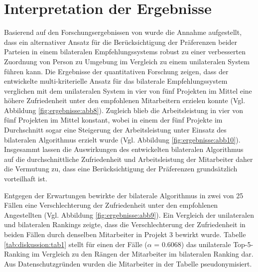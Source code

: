 \section{Interpretation der Ergebnisse}
Basierend auf den Forschungsergebnissen von \textcite[S.1 ff.]{link:booklet} wurde die Annahme aufgestellt, dass ein alternativer Ansatz für die Berücksichtigung der Präferenzen beider Parteien in einem bilateralen Empfehlungssystems robust zu einer verbesserten Zuordnung von Person zu Umgebung im Vergleich zu einem unilateralen System führen kann.
Die Ergebnisse der quantitativen Forschung zeigen, dass der entwickelte multi-kriterielle Ansatz für das bilaterale Empfehlungssystem verglichen mit dem unilateralen System in vier von fünf Projekten im Mittel eine höhere Zufriedenheit unter den empfohlenen Mitarbeitern erzielen konnte (Vgl. Abbildung \ref{fig:ergebnisse:abb8}).
Zugleich blieb die Arbeitsleistung in vier von fünf Projekten im Mittel konstant, wobei in einem der fünf Projekte im Durchschnitt sogar eine Steigerung der Arbeitsleistung unter Einsatz des bilateralen Algorithmus erzielt wurde (Vgl. Abbildung \ref{fig:ergebnisse:abb10}).
Insgesammt lassen die Auswirkungen des entwickelten bilateralen Algorithmus auf die durchschnittliche Zufriedenheit und Arbeitsleistung der Mitarbeiter daher die Vermutung zu, dass eine Berücksichtigung der Präferenzen grundsätzlich vorteilhaft ist.

Entgegen der Erwartungen bewirkte der bilaterale Algorithmus in zwei von 25 Fällen eine Verschlechterung der Zufriedenheit unter den empfohlenen Angestellten (Vgl. Abbildung \ref{fig:ergebnisse:abb9}).
Ein Vergleich der unilateralen und bilateralen Rankings zeigte, dass die Verschlechterung der Zufriedenheit in beiden Fällen durch denselben Mitarbeiter in Projekt 3 bewirkt wurde.
Tabelle \ref{tab:diskussion:tab1} stellt für einen der Fälle ($\alpha$ = 0.6068) das unilaterale Top-5-Ranking im Vergleich zu den Rängen der Mitarbeiter im bilateralen Ranking dar.
Aus Datenschutzgründen wurden die Mitarbeiter in der Tabelle pseudonymisiert.

